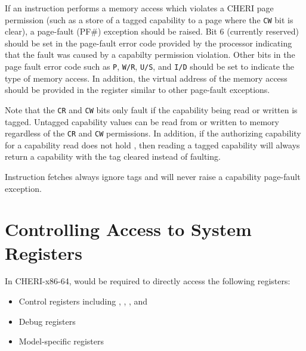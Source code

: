 If an instruction performs a memory access which violates a CHERI page
permission (such as a store of a tagged capability to a page where the
\texttt{CW} bit is clear), a page-fault (PF\#) exception should be
raised.  Bit 6 (currently reserved) should be set in the page-fault
error code provided by the processor indicating that the fault was
caused by a capabilty permission violation.  Other bits in the page
fault error code such as \texttt{P}, \texttt{W/R}, \texttt{U/S}, and
\texttt{I/D} should be set to indicate the type of memory access.  In
addition, the virtual address of the memory access should be provided
in the \CRTWO{} register similar to other page-fault exceptions.

Note that the \texttt{CR} and \texttt{CW} bits only fault if the
capability being read or written is tagged.  Untagged capability
values can be read from or written to memory regardless of the
\texttt{CR} and \texttt{CW} permissions.  In addition, if the
authorizing capability for a capability read does not hold \cappermLC,
then reading a tagged capability will always return a capability with
the tag cleared instead of faulting.

Instruction fetches always ignore tags and will never raise a
capability page-fault exception.

\section{Controlling Access to System Registers}

In CHERI-x86-64, \cappermASR{} would be required to directly access the
following registers:

\begin{itemize}
  \item Control registers including \KCC{}, \KSC{}, \CSTAR{}, and \KGS{}
  \item Debug registers
  \item Model-specific registers
\end{itemize}
